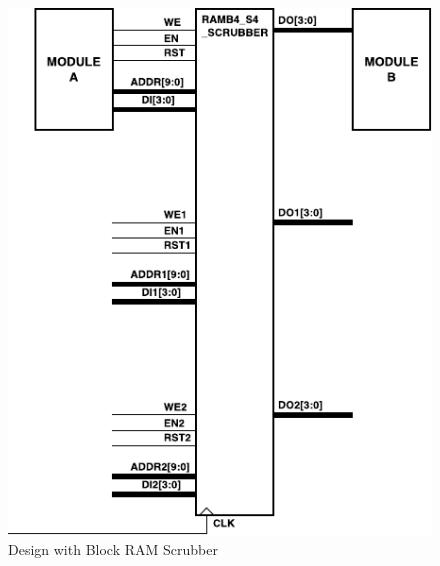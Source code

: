 \begin{figure}[htb]
\begin{center}
\includegraphics[scale=1]{ramb4_s4_tmr_design.pdf}
\caption{Design with Block RAM Scrubber}
\label{fig:ramb4_s4_tmr_design}
\end{center}
\end{figure}

